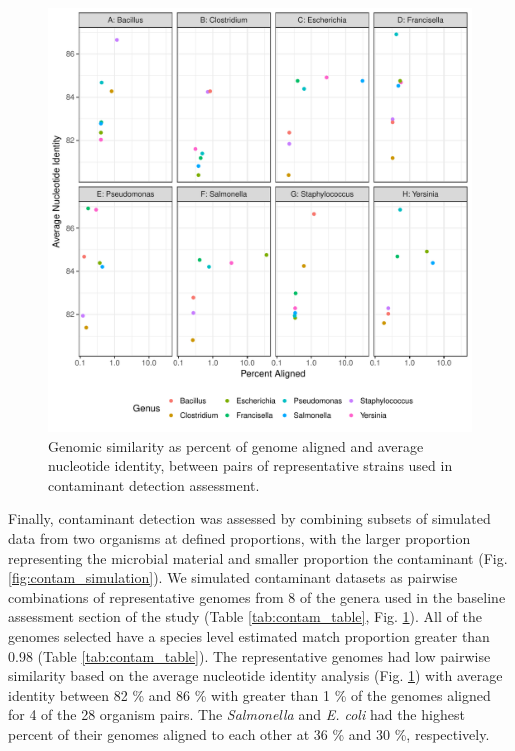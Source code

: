 \documentclass[fleqn,10pt,lineno]{wlpeerj}\usepackage[]{graphicx}\usepackage[]{color}
\makeatletter
\def\maxwidth{ %
  \ifdim\Gin@nat@width>\linewidth
    \linewidth
  \else
    \Gin@nat@width
  \fi
}
\newenvironment{knitrout}{}{} %
\makeatother
\begin{document}
\begin{knitrout}
\color{fgcolor}\begin{figure}
\includegraphics[width=\maxwidth]{figure/contam_ani-1} \caption[Genomic similarity as percent of genome aligned and average nucleotide identity, between pairs of representative strains used in contaminant detection assessment]{Genomic similarity as percent of genome aligned and average nucleotide identity, between pairs of representative strains used in contaminant detection assessment.}\label{fig:contam_ani}
\end{figure}


\end{knitrout}


Finally, contaminant detection was assessed by combining subsets of simulated data from two organisms at defined proportions,
with the larger proportion representing the microbial material and smaller proportion the contaminant (Fig. \ref{fig:contam_simulation}).
We simulated contaminant datasets as pairwise combinations of representative genomes from 8 of the genera used in the baseline assessment section of the study (Table \ref{tab:contam_table}, Fig. \ref{fig:contam_ani}).
All of the genomes selected have a species level estimated match proportion greater than 0.98 (Table \ref{tab:contam_table}). 
The representative genomes had low pairwise similarity based on the average nucleotide identity analysis (Fig. \ref{fig:contam_ani}) with average identity between 82 \% and 86 \% with greater than 1 \% of the genomes aligned for 4 of the 28 organism pairs. 
The \textit{Salmonella} and \textit{E. coli} had the highest percent of their genomes aligned to each other at 36 \% and 30 \%, respectively. 
\end{document}
